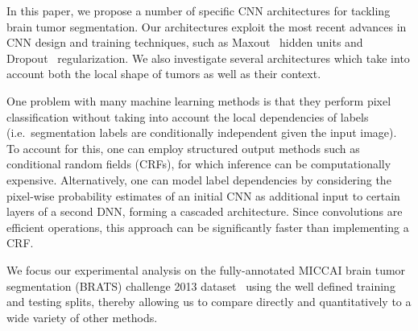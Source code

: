 \documentclass[final,5p,times,twocolumn]{elsarticle}
\begin{document}


In this paper, we propose a number of specific CNN architectures for tackling brain tumor segmentation. Our architectures exploit the most recent advances in CNN design and training techniques, such as Maxout~\citep{Goodfellow_maxout_2013} hidden units and Dropout~\citep{Srivastava14a} regularization.  We also investigate several architectures which take into account both the local shape of tumors as well as their context.  %

One problem with many machine learning methods is that they perform pixel classification without taking into account the local dependencies of labels (i.e.\ segmentation labels are conditionally independent given the input image). To account for this, one can employ structured output methods such as conditional random fields (CRFs), for which inference can be computationally expensive.  Alternatively, one can model label dependencies by considering the pixel-wise probability estimates of an initial CNN as additional input to certain layers of a second DNN, forming a cascaded architecture. Since convolutions are efficient operations, this approach can be significantly faster than implementing a CRF. 



We focus our experimental analysis on the fully-annotated MICCAI brain tumor segmentation (BRATS) challenge 2013 dataset~\citep{braintumorsegmentationdotorg} using the well defined training and testing splits, thereby allowing us to compare directly and quantitatively to a wide variety of other methods.
\end{document}
